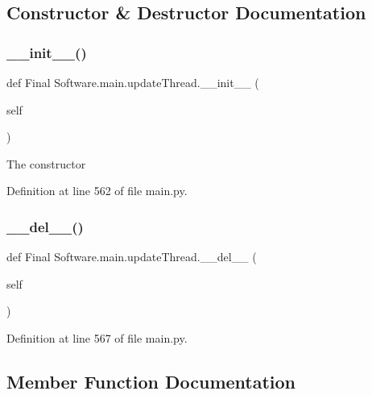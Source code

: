 \subsection{Constructor \& Destructor Documentation}
\mbox{\label{class_final_01_software_1_1main_1_1update_thread_a636e4a600ff29f055030f4282d6b4976}} 
\subsubsection{\_\_init\_\_()}
{\footnotesize\ttfamily def Final Software.\+main.\+update\+Thread.\+\_\+\+\_\+init\+\_\+\+\_\+ (\begin{DoxyParamCaption}\item[{}]{self }\end{DoxyParamCaption})}

\begin{DoxyVerb}The constructor
\end{DoxyVerb}
 

Definition at line 562 of file main.\+py.

\mbox{\label{class_final_01_software_1_1main_1_1update_thread_a621e69939040744a28681fbb7dfecfe2}} 
\subsubsection{\_\_del\_\_()}
{\footnotesize\ttfamily def Final Software.\+main.\+update\+Thread.\+\_\+\+\_\+del\+\_\+\+\_\+ (\begin{DoxyParamCaption}\item[{}]{self }\end{DoxyParamCaption})}



Definition at line 567 of file main.\+py.



\subsection{Member Function Documentation}
\mbox{\label{class_final_01_software_1_1main_1_1update_thread_ac594a7ffc7639cd9a4da502c89d4f345}} 
